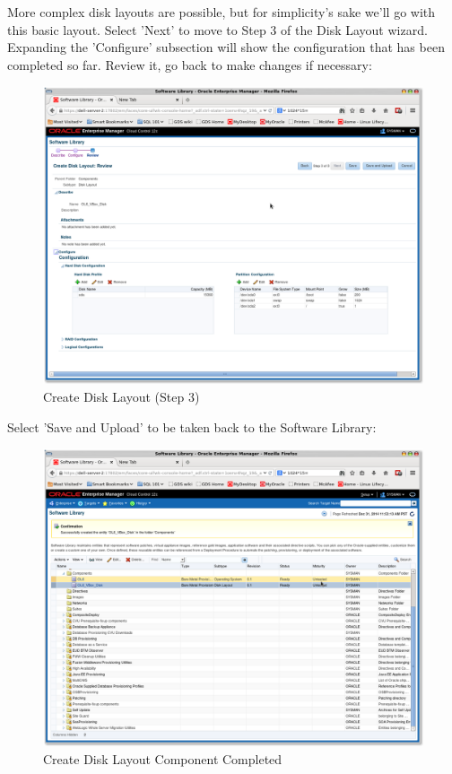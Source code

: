 \documentclass[11pt]{article}
\begin{document}
More complex disk layouts are possible, but for simplicity's sake we'll go with this basic layout. Select 'Next' to move to Step 3 of the Disk Layout wizard. Expanding the 'Configure' subsection will show the configuration that has been completed so far. Review it, go back to make changes if necessary:
\begin{figure}[htb]
\centering
\includegraphics[width=.9\linewidth]{./images/Create_DL_3.png}
\caption{Create Disk Layout (Step 3)}
\end{figure}  
\clearpage

Select 'Save and Upload' to be taken back to the Software Library:
\begin{figure}[htb]
\centering
\includegraphics[width=.9\linewidth]{./images/Create_DL_Completed.png}
\caption{Create Disk Layout Component Completed}
\end{figure}
\clearpage
\end{document}
